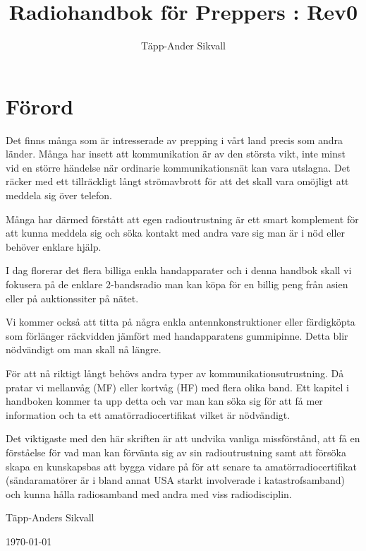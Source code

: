 \documentclass[12ypt,swedish,a4paper]{report}
\begin{document}
\title{Radiohandbok för Preppers : Rev0}
\author{Täpp-Ander Sikvall}
\maketitle

\listoftodos
\clearpage

\begingroup
\setlength{\parskip}{1em plus 0.5em minus 0.2em}
\setlength{\parindent}{0pt}
\section*{Förord}

Det finns många som är intresserade av prepping i vårt land precis som andra länder. Många har insett att kommunikation är av den största vikt, inte minst vid en större händelse när ordinarie kommunikationsnät kan vara utslagna. Det räcker med ett tillräckligt långt strömavbrott för att det skall vara omöjligt att meddela sig över telefon.

Många har därmed förstått att egen radioutrustning är ett smart komplement för att kunna meddela sig och söka kontakt med andra vare sig man är i nöd eller behöver enklare hjälp.

I dag florerar det flera billiga enkla handapparater och i denna handbok skall vi fokusera på de enklare 2-bandsradio man kan köpa för en billig peng från asien eller på auktionssiter på nätet.

Vi kommer också att titta på några enkla antennkonstruktioner eller färdigköpta som förlänger räckvidden jämfört med handapparatens gummipinne. Detta blir nödvändigt om man skall nå längre.

För att nå riktigt långt behövs andra typer av kommunikationsutrustning. Då pratar vi mellanvåg (MF) eller kortvåg (HF) med flera olika band. Ett kapitel i handboken kommer ta upp detta och var man kan söka sig för att få mer information och ta ett amatörradiocertifikat vilket är nödvändigt.

Det viktigaste med den här skriften är att undvika vanliga missförstånd, att få en förståelse för vad man kan förvänta sig av sin radioutrustning samt att försöka skapa en kunskapsbas att bygga vidare på för att senare ta amatörradiocertifikat (sändaramatörer är i bland annat USA starkt involverade i katastrofsamband) och kunna hålla radiosamband med andra med viss radiodisciplin.

Täpp-Anders Sikvall

\today
\endgroup
\clearpage
\end{document}
